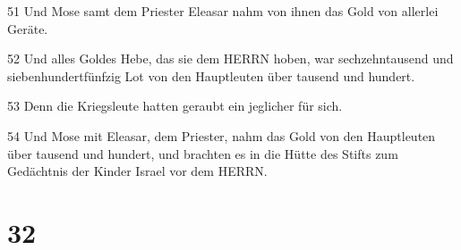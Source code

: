 \par 51 Und Mose samt dem Priester Eleasar nahm von ihnen das Gold von allerlei Geräte.
\par 52 Und alles Goldes Hebe, das sie dem HERRN hoben, war sechzehntausend und siebenhundertfünfzig Lot von den Hauptleuten über tausend und hundert.
\par 53 Denn die Kriegsleute hatten geraubt ein jeglicher für sich.
\par 54 Und Mose mit Eleasar, dem Priester, nahm das Gold von den Hauptleuten über tausend und hundert, und brachten es in die Hütte des Stifts zum Gedächtnis der Kinder Israel vor dem HERRN.

\chapter{32}

